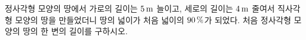 정사각형 모양의 땅에서 가로의 길이는 $5\mkern3mu \mathrm{m}$ 늘이고, 세로의 길이는 $4\mkern3mu \mathrm{m}$ 줄여서 직사각형 모양의 땅을 만들었더니 땅의 넓이가 처음 넓이의 $90\mkern3mu \%$가 되었다. 처음 정사각형 모양의 땅의 한 변의 길이를 구하시오.
